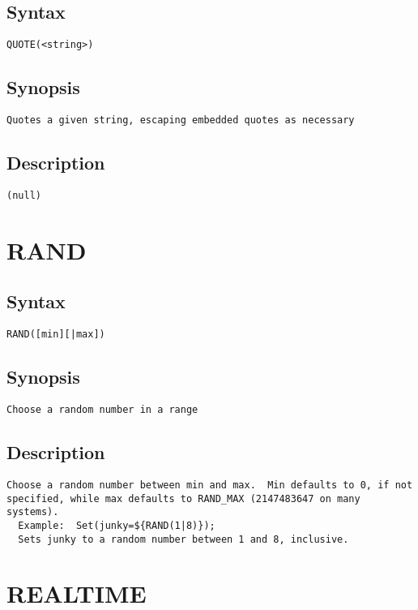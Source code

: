 \subsection{Syntax}
\begin{verbatim}
QUOTE(<string>)
\end{verbatim}
\subsection{Synopsis}
\begin{verbatim}
Quotes a given string, escaping embedded quotes as necessary
\end{verbatim}
\subsection{Description}
\begin{verbatim}
(null)
\end{verbatim}


\section{RAND}
\subsection{Syntax}
\begin{verbatim}
RAND([min][|max])
\end{verbatim}
\subsection{Synopsis}
\begin{verbatim}
Choose a random number in a range
\end{verbatim}
\subsection{Description}
\begin{verbatim}
Choose a random number between min and max.  Min defaults to 0, if not
specified, while max defaults to RAND_MAX (2147483647 on many systems).
  Example:  Set(junky=${RAND(1|8)}); 
  Sets junky to a random number between 1 and 8, inclusive.

\end{verbatim}


\section{REALTIME}
